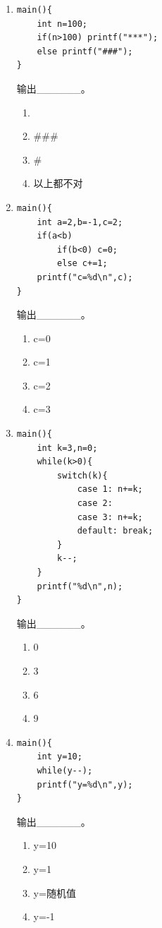 \documentclass[a4paper,12pt]{article}
\begin{document}
\begin{enumerate}
	\item
	      \begin{verbatim}
main(){
    int n=100;
    if(n>100) printf("***");
    else printf("###");
}
    \end{verbatim}
	      输出\_\_\_\_\_\_。
	      \begin{enumerate}
		      \item[A)] \*\*\*
		      \item[B)] \#\#\#
		      \item[C)] \*\#\*
		      \item[D)] 以上都不对
	      \end{enumerate}
	      \vspace{0.3cm}

	\item
	      \begin{verbatim}
main(){
    int a=2,b=-1,c=2;
    if(a<b)
        if(b<0) c=0;
        else c+=1;
    printf("c=%d\n",c);
}
    \end{verbatim}
	      输出\_\_\_\_\_\_。
	      \begin{enumerate}
		      \item[A)] c=0
		      \item[B)] c=1
		      \item[C)] c=2
		      \item[D)] c=3
	      \end{enumerate}
	      \vspace{0.3cm}

	\item
	      \begin{verbatim}
main(){
    int k=3,n=0;
    while(k>0){
        switch(k){
            case 1: n+=k;
            case 2:
            case 3: n+=k;
            default: break;
        }
        k--;
    }
    printf("%d\n",n);
}
    \end{verbatim}
	      输出\_\_\_\_\_\_。
	      \begin{enumerate}
		      \item[A)] 0
		      \item[B)] 3
		      \item[C)] 6
		      \item[D)] 9
	      \end{enumerate}
	      \vspace{0.3cm}

	\item
	      \begin{verbatim}
main(){
    int y=10;
    while(y--);
    printf("y=%d\n",y);
}
    \end{verbatim}
	      输出\_\_\_\_\_\_。
	      \begin{enumerate}
		      \item[A)] y=10
		      \item[B)] y=1
		      \item[C)] y=随机值
		      \item[D)] y=-1
	      \end{enumerate}
	      \vspace{0.3cm}


\end{enumerate}
\end{document}
